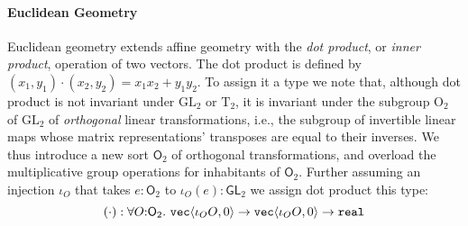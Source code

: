 \documentclass{sigplanconf}
\newcommand{\GL}[1]{\mathrm{GL}_#1}
\newcommand{\SynGL}[1]{\mathsf{GL}_#1}
\newcommand{\Orth}[1]{\mathrm{O}_#1}
\newcommand{\SynOrth}[1]{\mathsf{O}_#1}
\newcommand{\Transl}[1]{\mathrm{T}_#1}
\newcommand{\tyPrim}[2]{\textup{\texttt{#1}}\langle #2 \rangle}
\newcommand{\tyPrimNm}[1]{\textup{\texttt{#1}}}
\theoremstyle{examplestyle}
\theoremstyle{restatementstyle}
\begin{document}
\paragraph{Euclidean Geometry} Euclidean geometry extends affine
geometry with the \emph{dot product}, or \emph{inner product},
operation of two vectors. The dot product is defined 
by
$  (x_1,y_1) \cdot (x_2,y_2) = x_1x_2 + y_1y_2$.
To %
assign it a type we note that, although dot product is not
invariant under $\GL{2}$ or $\Transl{2}$, it
is invariant under the subgroup $\Orth{2}$ of $\GL{2}$ of
\emph{orthogonal} linear transformations, i.e., the subgroup of
invertible linear maps whose matrix representations' transposes are
equal to their inverses. We thus introduce a new sort $\SynOrth{2}$ of
orthogonal transformations, and overload the multiplicative group
operations for inhabitants of $\SynOrth{2}$. Further assuming an
injection $\iota_O$ that takes $e : \SynOrth{2}$ to $\iota_O(e) :
\SynGL{2}$ we assign dot product this type:
\begin{displaymath}
  (\cdot) : \forall O \mathord: \SynOrth{2}.\ \tyPrim{vec}{\iota_OO, 0} \to \tyPrim{vec}{\iota_OO, 0} \to \tyPrimNm{real}
\end{displaymath}
\end{document}
